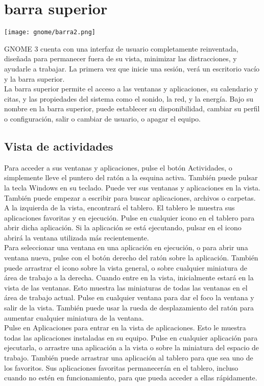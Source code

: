 \chapter{barra superior}
\begin{center}
\texttt{[image: gnome/barra2.png]} 
\end{center}
GNOME 3 cuenta con una interfaz de usuario completamente reinventada, diseñada para permanecer fuera de su vista, minimizar las distracciones, y ayudarle a trabajar. La primera vez que inicie una sesión, verá un escritorio vacío y la barra superior.\\

La barra superior permite el acceso a las ventanas y aplicaciones, su calendario y citas, y las propiedades del sistema como el sonido, la red, y la energía. Bajo su nombre en la barra superior, puede establecer su disponibilidad, cambiar su perfil o configuración, salir o cambiar de usuario, o apagar el equipo.
\section{Vista de actividades}
Para acceder a sus ventanas y aplicaciones, pulse el botón Actividades, o simplemente lleve el puntero del ratón a la esquina activa. También puede pulsar la tecla Windows en su teclado. Puede ver sus ventanas y aplicaciones en la vista. También puede empezar a escribir para buscar aplicaciones, archivos o carpetas.\\

A la izquierda de la vista, encontrará el tablero. El tablero le muestra sus aplicaciones favoritas y en ejecución. Pulse en cualquier icono en el tablero para abrir dicha aplicación. Si la aplicación se está ejecutando, pulsar en el icono abrirá la ventana utilizada ​​más recientemente.\\
Para seleccionar una ventana en una aplicación en ejecución, o para abrir una ventana nueva, pulse con el botón derecho del ratón sobre la aplicación. También puede arrastrar el icono sobre la vista general, o sobre cualquier miniatura de área de trabajo a la derecha.
Cuando entre en la vista, inicialmente estará en la vista de las ventanas. Esto muestra las miniaturas de todas las ventanas en el área de trabajo actual. Pulse en cualquier ventana para dar el foco la ventana y salir de la vista. También puede usar la rueda de desplazamiento del ratón para aumentar cualquier miniatura de la ventana.\\
Pulse en Aplicaciones para entrar en la vista de aplicaciones. Esto le muestra todas las aplicaciones instaladas en su equipo. Pulse en cualquier aplicación para ejecutarla, o arrastre una aplicación a la vista o sobre la miniatura del espacio de trabajo. También puede arrastrar una aplicación al tablero para que sea uno de los favoritos. Sus aplicaciones favoritas permanecerán en el tablero, incluso cuando no estén en funcionamiento, para que pueda acceder a ellas rápidamente.

